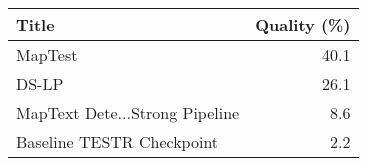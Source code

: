 \begin{tabular}{lr}
\toprule
Title & Quality (\%) \\
\midrule
MapTest & 40.1 \\
DS-LP & 26.1 \\
MapText Dete...Strong Pipeline & 8.6 \\
Baseline TESTR Checkpoint & 2.2 \\
\bottomrule
\end{tabular}
